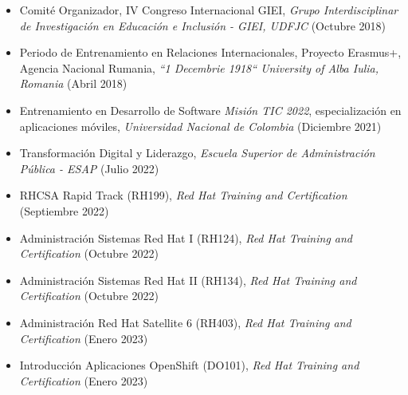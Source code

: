 \documentclass[overlapped,line,final]{../../templates/MichaelDeCorteCV/lib/res}
\begin{document}
\begin{resume}
\begin{itemize}
	\item Comité Organizador, IV Congreso Internacional GIEI, \textit{Grupo Interdisciplinar de Investigación en Educación e Inclusión - GIEI, UDFJC} (Octubre 2018) \href{https://raw.githubusercontent.com/dtorot/NemqCV/profile-engineer/latex/docs/UDFJC-IVGIEI-NEES-AcademicCommittee3-4-5-Oct2018.pdf}{}
	\item Periodo de Entrenamiento en Relaciones Internacionales, Proyecto Erasmus+, Agencia Nacional Rumania, \textit{``1 Decembrie 1918`` University of Alba Iulia, Romania} (Abril 2018) \href{https://raw.githubusercontent.com/dtorot/NemqCV/profile-engineer/latex/docs/UDFJC-ERASMUS-ROMANIA-TrainingPeriod22-28Abr2018.pdf}{}
	\item Entrenamiento en Desarrollo de Software \textit{Misión TIC 2022}, especialización en aplicaciones móviles, \textit{Universidad Nacional de Colombia} (Diciembre 2021) \href{https://raw.githubusercontent.com/dtorot/NemqCV/profile-engineer/latex/docs/CC_79948255-ProgMINTIC2021.pdf}{}
	\item Transformación Digital y Liderazgo, \textit{Escuela Superior de Administración Pública - ESAP} (Julio 2022)  \href{https://raw.githubusercontent.com/dtorot/NemqCV/profile-engineer/latex/docs/esapCert2022.pdf}{}	
	\item RHCSA Rapid Track (RH199), \textit{Red Hat Training and Certification} (Septiembre 2022) \href{https://raw.githubusercontent.com/dtorot/NemqCV/profile-engineer/latex/docs/Certificate of Attendance (RH199-8.0).pdf}{}
	\item Administración Sistemas Red Hat I (RH124), \textit{Red Hat Training and Certification} (Octubre 2022) \href{https://raw.githubusercontent.com/dtorot/NemqCV/profile-engineer/latex/docs/Certificate of Attendance_RH124-9_0.pdf}{}	
	\item Administración Sistemas Red Hat II (RH134), \textit{Red Hat Training and Certification} (Octubre 2022) \href{https://raw.githubusercontent.com/dtorot/NemqCV/profile-engineer/latex/docs/Certificate of Attendance (RH134-9.0).pdf}{}
	\item Administración Red Hat Satellite 6 (RH403), \textit{Red Hat Training and Certification} (Enero 2023) \href{https://raw.githubusercontent.com/dtorot/NemqCV/profile-engineer/latex/docs/Certificate of Attendance (RH403-6.6).pdf}{}
	\item Introducción Aplicaciones OpenShift (DO101), \textit{Red Hat Training and Certification} (Enero 2023) \href{https://raw.githubusercontent.com/dtorot/NemqCV/profile-engineer/latex/docs/Certificate of Attendance (DO101-4.6).pdf}{}

\end{itemize}
\end{resume}
\end{document}

